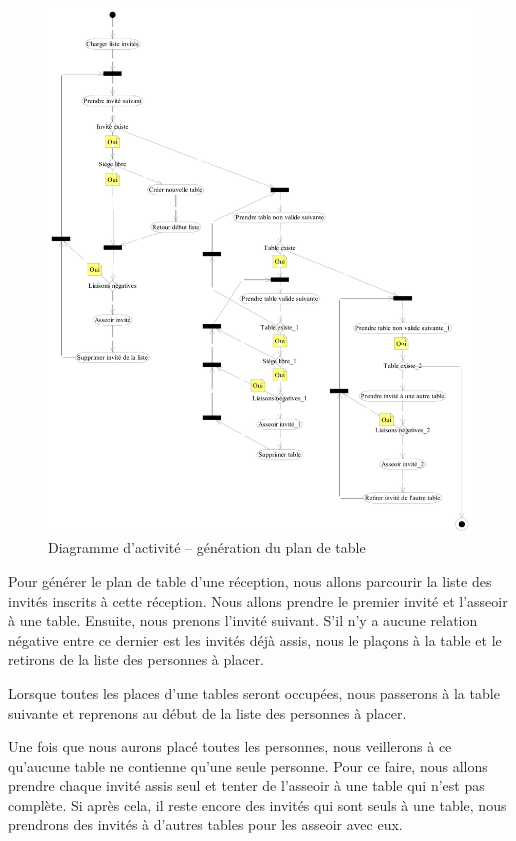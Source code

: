 \begin{figure}
  \centering
  \includegraphics[width=\textwidth]{IMG/da_plan_tables}
  \caption{Diagramme d'activité -- génération du plan de table}
  \label{img_da_plan_tables}
\end{figure}

Pour générer le plan de table d'une réception, nous allons parcourir la liste des invités inscrits à cette réception. Nous allons prendre le premier invité et l'asseoir à une table. Ensuite, nous prenons l'invité suivant. S'il n'y a aucune relation négative entre ce dernier est les invités déjà assis, nous le plaçons à la table et le retirons de la liste des personnes à placer.

Lorsque toutes les places d'une tables seront occupées, nous passerons à la table suivante et reprenons au début de la liste des personnes à placer.

Une fois que nous aurons placé toutes les personnes, nous veillerons à ce qu'aucune table ne contienne qu'une seule personne. Pour ce faire, nous allons prendre chaque invité assis seul et tenter de l'asseoir à une table qui n'est pas complète. Si après cela, il reste encore des invités qui sont seuls à une table, nous prendrons des invités à d'autres tables pour les asseoir avec eux.

